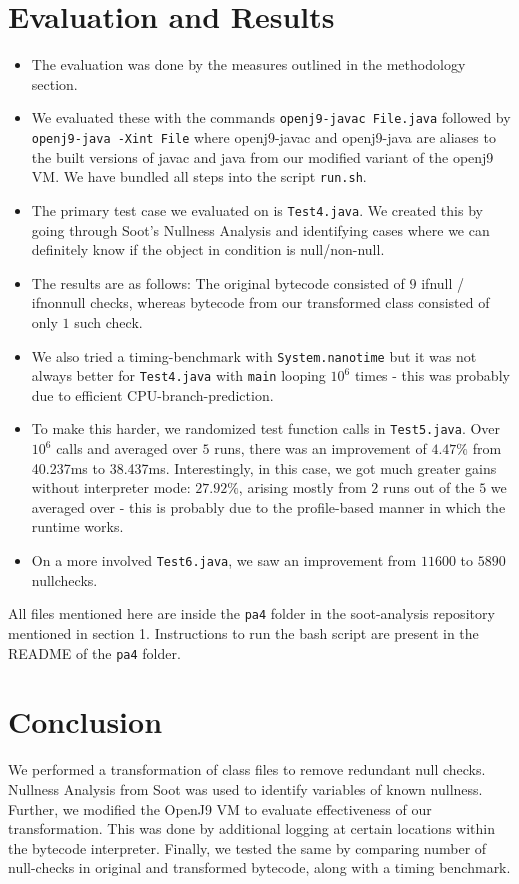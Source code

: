 \documentclass{article}
\begin{document}
\section{Evaluation and Results}

\begin{itemize}
\item The evaluation was done by the measures outlined in the methodology section.
\item We evaluated these with the commands \texttt{openj9-javac  File.java} followed by \texttt{openj9-java -Xint File} where openj9-javac and openj9-java are aliases to the built versions of javac and java from our modified variant of the openj9 VM. We have bundled all steps into the script \texttt{run.sh}.
\item The primary test case we evaluated on is \texttt{Test4.java}. We created this by going through Soot's Nullness Analysis and identifying cases where we can definitely know if the object in condition is null/non-null.
\item The results are as follows: The original bytecode consisted of $9$ ifnull / ifnonnull checks, whereas bytecode from our transformed class consisted of only $1$ such check.
\item We also tried a timing-benchmark with \texttt{System.nanotime} but it was not always better for \texttt{Test4.java} with \texttt{main} looping $10^6$ times - this was probably due to efficient CPU-branch-prediction.
\item To make this harder, we randomized test function calls in \texttt{Test5.java}. Over $10^6$ calls and averaged over $5$ runs, there was an improvement of $4.47\%$ from 40.237ms to 38.437ms. Interestingly, in this case, we got much greater gains without interpreter mode: $27.92\%$, arising mostly from $2$ runs out of the $5$ we averaged over - this is probably due to the profile-based manner in which the runtime works.
\item On a more involved \texttt{Test6.java}, we saw an improvement from $11600$ to $5890$ nullchecks.
\end{itemize}

All files mentioned here are inside the \texttt{pa4} folder in the soot-analysis repository mentioned in section 1. Instructions to run the bash script are present in the README of the \texttt{pa4} folder.

\section{Conclusion}

We performed a transformation of class files to remove redundant null checks. Nullness Analysis from Soot was used to identify variables of known nullness. Further, we modified the OpenJ9 VM to evaluate effectiveness of our transformation. This was done by additional logging at certain locations within the bytecode interpreter. Finally, we tested the same by comparing number of null-checks in original and transformed bytecode, along with a timing benchmark.
\end{document}
